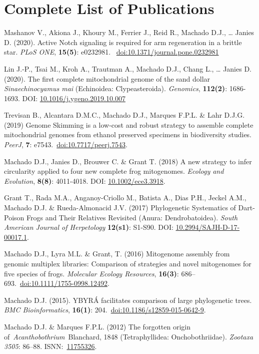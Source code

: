 
\section{Complete List of Publications}

	{
		\setlength{\parskip}{.5em}\renewcommand{\baselinestretch}{2.0}
		\begin{hangparas}{.25in}{1}
	
	    Mashanov V., Akiona J., Khoury M., Ferrier J., Reid R., Machado D.J., … Janies D. (2020). Active Notch signaling is required for arm regeneration in a brittle star. \emph{PLoS ONE}, \textbf{15(5)}: e0232981. ~\href{https://doi.org/10.1371/journal.pone.0232981}{doi:10.1371/journal.pone.0232981}
	    
	    Lin J.-P., Tsai M., Kroh A., Trautman A., Machado D.J., Chang L., … Janies D. (2020). The first complete mitochondrial genome of the sand dollar \emph{Sinaechinocyamus mai} (Echinoidea: Clypeasteroida). \emph{Genomics}, \textbf{112(2)}: 1686-1693. DOI: \href{https://doi.org/10.1016/j.ygeno.2019.10.007}{10.1016/j.ygeno.2019.10.007}
	
		Trevisan B., Alcantara D.M.C., Machado D.J., Marques F.P.L. \& Lahr D.J.G. (2019) Genome Skimming is a low-cost and robust strategy to assemble complete mitochondrial genomes from ethanol preserved specimens in biodiversity studies. \emph{PeerJ}, \textbf{7}: e7543.~\href{https://doi.org/10.7717/peerj.7543}{doi:10.7717/peerj.7543}.

		Machado D.J., Janies D., Brouwer C. \& Grant T. (2018) A new strategy to infer circularity applied to four new complete frog mitogenomes. \emph{Ecology and Evolution}, \textbf{8(8)}: 4011-4018. DOI: \href{http://doi.wiley.com/10.1002/ece3.3918}{10.1002/ece3.3918}.

		Grant T., Rada M.A., Anganoy-Criollo M., Batista A., Dias P.H., Jeckel A.M., Machado D.J. \& Rueda-Almonacid J.V. (2017) Phylogenetic Systematics of Dart-Poison Frogs and Their Relatives Revisited (Anura: Dendrobatoidea). \emph{South American Journal of Herpetology} \textbf{12(s1)}: S1-S90. DOI: \href{http://www.bioone.org/doi/10.2994/SAJH-D-17-00017.1}{10.2994/SAJH-D-17-00017.1}.

		Machado D.J., Lyra M.L. \& Grant, T. (2016) Mitogenome assembly from genomic multiplex libraries: Comparison of strategies and novel mitogenomes for five species of frogs. \emph{Molecular Ecology Resources}, \textbf{16(3)}: 686--693.~\href{https://doi.org/10.1111/1755-0998.12492}{doi:10.1111/1755-0998.12492}.

		Machado D.J. (2015). YBYRÁ facilitates comparison of large phylogenetic trees. \emph{BMC Bioinformatics}, \textbf{16(1)}: 204.~\href{https://doi.org/10.1186/s12859-015-0642-9}{doi:10.1186/s12859-015-0642-9}.

		Machado D.J. \& Marques F.P.L. (2012) The forgotten origin of~\emph{Acanthobothrium}~Blanchard, 1848 (Tetraphyllidea: Onchobothriidae). \emph{Zootaxa} \emph{3505}: 86--88. ISNN:~\href{http://www.mapress.com/zootaxa/2012/f/z03505p088f.pdf}{11755326}.

		\end{hangparas}
	}

